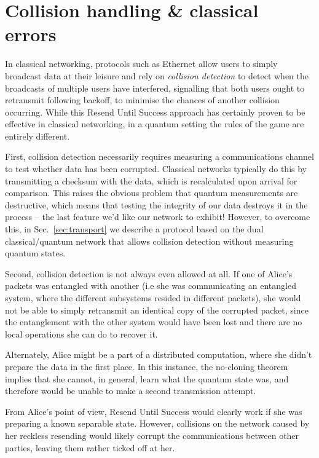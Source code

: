 \documentclass[aps,rmp,twocolumn,amsmath,amssymb,nofootinbib,superscriptaddress]{revtex4}
\begin{document}
%
%

\section{Collision handling \& classical errors} \label{sec:collision}

In classical networking, protocols such as Ethernet allow users to simply broadcast data at their leisure and rely on \emph{collision detection} to detect when the broadcasts of multiple users have interfered, signalling that both users ought to retransmit following backoff, to minimise the chances of another collision occurring. While this {\sc Resend Until Success} approach has certainly proven to be effective in classical networking, in a quantum setting the rules of the game are entirely different.

First, collision detection necessarily requires measuring a communications channel to test whether data has been corrupted. Classical networks typically do this by transmitting a checksum with the data, which is recalculated upon arrival for comparison. This raises the obvious problem that quantum measurements are destructive, which means that testing the integrity of our data destroys it in the process -- the last feature we'd like our network to exhibit! However, to overcome this, in Sec.~\ref{sec:transport} we describe a protocol based on the dual classical/quantum network that allows collision detection without measuring quantum states.

Second, collision detection is not always even allowed at all. If one of Alice's packets was entangled with another (i.e she was communicating an entangled system, where the different subsystems resided in different packets), she would not be able to simply retransmit an identical copy of the corrupted packet, since the entanglement with the other system would have been lost and there are no local operations she can do to recover it.

Alternately, Alice might be a part of a distributed computation, where she didn't prepare the data in the first place. In this instance, the no-cloning theorem implies that she cannot, in general, learn what the quantum state was, and therefore would be unable to make a second transmission attempt.

From Alice's point of view, {\sc Resend Until Success} would clearly work if she was preparing a known separable state. However, collisions on the network caused by her reckless resending would likely corrupt the communications between other parties, leaving them rather ticked off at her.
\end{document}
